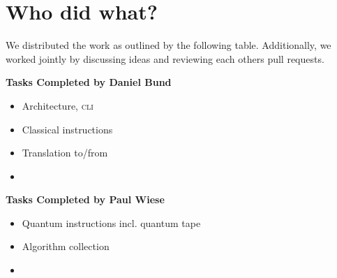 \section{Who did what?}

We distributed the work as outlined by the following table.
Additionally, we worked jointly by discussing ideas and reviewing each others pull requests.

\vspace{1em}

\noindent
\begin{minipage}[t]{0.48\textwidth}
    \textbf{Tasks Completed by Daniel Bund}
    \begin{itemize}
        \item Architecture, \textsc{cli}
        \item Classical instructions
        \item Translation to/from \qiskit
        \item {}
    \end{itemize}
\end{minipage}
\hfill
\begin{minipage}[t]{0.48\textwidth}
    \textbf{Tasks Completed by Paul Wiese}
    \begin{itemize}
        \item Quantum instructions incl. quantum tape
        \item Algorithm collection
        \item {}
    \end{itemize}
\end{minipage}

